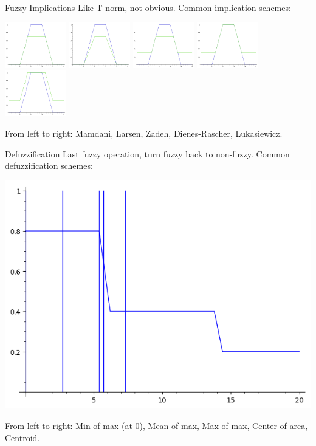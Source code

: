 \documentclass{beamer}
\begin{document}
\begin{frame}{Fuzzy Implications}
	Like T-norm, not obvious. Common implication schemes:

	\begin{multicols}{5}
		\includegraphics[width=0.2\textwidth]{mamdani}
		\includegraphics[width=0.2\textwidth]{larsen}
		\includegraphics[width=0.2\textwidth]{zadeh}
		\includegraphics[width=0.2\textwidth]{dr}
		\includegraphics[width=0.2\textwidth]{luke}
	\end{multicols}

	From left to right: Mamdani, Larsen, Zadeh, Dienes-Rascher, Lukasiewicz.
\end{frame}

\begin{frame}{Defuzzification}
	Last fuzzy operation, turn fuzzy back to non-fuzzy. Common defuzzification
	schemes:

	\includegraphics[width=\textwidth]{defuz}

	From left to right: Min of max (at 0), Mean of max, Max of max, Center of
	area, Centroid.
\end{frame}
\end{document}
